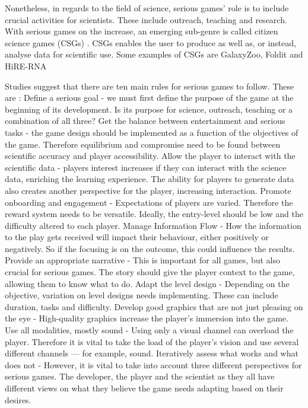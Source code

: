 	Nonetheless, in regards to the field of science, serious games' role is to include crucial activities for scientists. These include outreach, teaching and research. With serious games on the increase, an emerging sub-genre is called citizen science games (CSGs) \cite{10seriousrules}. CSGs enables the user to produce as well as, or instead, analyse data for scientific use. Some examples of CSGs are GalaxyZoo, Foldit and HiRE-RNA \cite{follett2015analysis,mazzanti2017can}
	
	Studies suggest that there are ten main rules for serious games to follow. These are \cite{10seriousrules}: Define a serious goal - we must first define the purpose of the game at the beginning of its development. Is its purpose for science, outreach, teaching or a combination of all three? Get the balance between entertainment and serious tasks - the game design should be implemented as a function of the objectives of the game. Therefore equilibrium and compromise need to be found between scientific accuracy and player accessibility. Allow the player to interact with the scientific data - players interest increases if they can interact with the science data, enriching the learning experience. The ability for players to generate data also creates another perspective for the player, increasing interaction. Promote onboarding and engagement - Expectations of players are varied. Therefore the reward system needs to be versatile. Ideally, the entry-level should be low and the difficulty altered to each player. Manage Information Flow - How the information to the play gets received will impact their behaviour, either positively or negatively. So if the focusing is on the outcome, this could influence the results. Provide an appropriate narrative - This is important for all games, but also crucial for serious games. The story should give the player context to the game, allowing them to know what to do. Adapt the level design - Depending on the objective, variation on level designs needs implementing. These can include duration, tasks and difficulty. Develop good graphics that are not just pleasing on the eye - High-quality graphics increase the player's immersion into the game. Use all modalities, mostly sound - Using only a visual channel can overload the player. Therefore it is vital to take the load of the player's vision and use several different channels — for example, sound. Iteratively assess what works and what does not - However, it is vital to take into account three different perspectives for serious games. The developer, the player and the scientist as they all have different views on what they believe the game needs adapting based on their desires.
	
